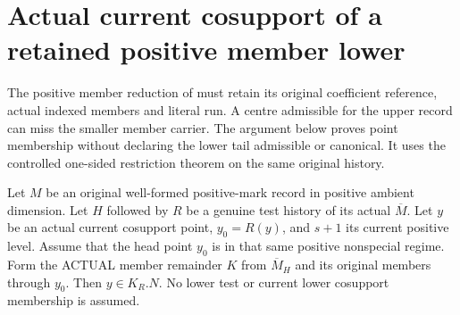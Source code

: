 \section{Actual current cosupport of a retained positive member lower}

The positive member reduction of
\cite[Sections~5--6]{bierstone-milman08-functoriality} must retain its
original coefficient reference, actual indexed members and literal run.
A centre admissible for the upper record can miss the smaller member
carrier. The argument below proves point membership without declaring
the lower tail admissible or canonical. It uses the controlled
one-sided restriction theorem on the same original history.

\begin{theorem}
\label{hir:original-positive-member-actual-endpoint-carrier}
\leanok
Let $M$ be an original well-formed positive-mark record in positive ambient
dimension. Let $H$ followed by $R$ be a genuine test history of its actual
$\overline M$. Let $y$ be an actual current cosupport point, $y_0=R(y)$,
and $s+1$ its current positive level. Assume that the head point $y_0$
is in that same positive nonspecial regime. Form the ACTUAL member
remainder $K$ from $\overline M_H$ and its original members through
$y_0$. Then $y\in K_R.N$. No lower test or current lower cosupport
membership is assumed.
\end{theorem}
